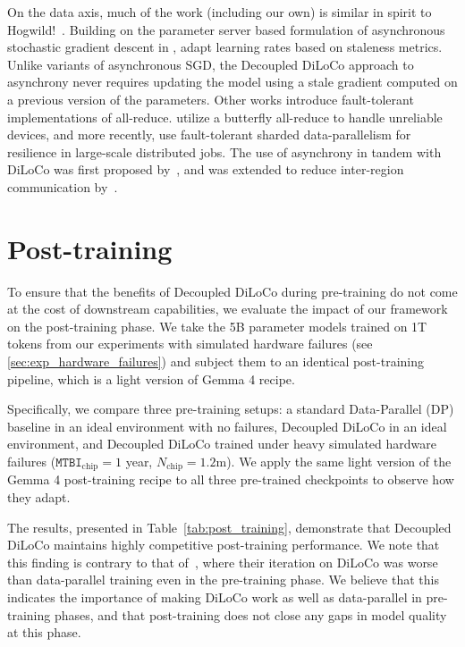 \documentclass[11pt, a4paper, twocolumn, copyright, google]{google}
\begin{document}
On the data axis, much of the work (including our own) is similar in spirit to Hogwild!~\citep{niu2011hogwildlockfreeapproachparallelizing}. Building on the parameter server based formulation of asynchronous stochastic gradient descent in \citet{dean2012large}, \citet{zhang2016staleness} adapt learning rates based on staleness metrics. Unlike variants of asynchronous SGD, the Decoupled DiLoCo approach to asynchrony never requires updating the model using a stale gradient computed on a previous version of the parameters. Other works introduce fault-tolerant implementations of all-reduce.  \citet{ryabinin2021moshpit} utilize a butterfly all-reduce to handle unreliable devices, and more recently, \citet{salpekar2026training} use fault-tolerant sharded data-parallelism for resilience in large-scale distributed jobs. The use of asynchrony in tandem with DiLoCo was first proposed by~\citet{liu2024asynchronous}, and was extended to reduce inter-region communication by~\citet{kim2025halos}.

\section{Post-training}\label{sec:post_training}

To ensure that the benefits of Decoupled DiLoCo during pre-training do not come at the cost of downstream capabilities, we evaluate the impact of our framework on the post-training phase. We take the 5B parameter models trained on 1T tokens from our experiments with simulated hardware failures (see \autoref{sec:exp_hardware_failures}) and subject them to an identical post-training pipeline, which is a light version of Gemma 4 recipe.

Specifically, we compare three pre-training setups: a standard Data-Parallel (DP) baseline in an ideal environment with no failures, Decoupled DiLoCo in an ideal environment, and Decoupled DiLoCo trained under heavy simulated hardware failures ($\texttt{MTBI}_\text{chip} = 1$ year, $N_\text{chip}=1.2\text{m}$). We apply the same light version of the Gemma 4 post-training recipe to all three pre-trained checkpoints to observe how they adapt. 

The results, presented in Table~\ref{tab:post_training}, demonstrate that Decoupled DiLoCo maintains highly competitive post-training performance. We note that this finding is contrary to that of~\citet{acker2025happensnanochatmeetsdiloco}, where their iteration on DiLoCo was worse than data-parallel training even in the pre-training phase. We believe that this indicates the importance of making DiLoCo work as well as data-parallel in pre-training phases, and that post-training does not close any gaps in model quality at this phase.
\end{document}
